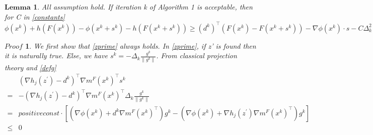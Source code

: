 \documentclass[10pt, oneside]{article}
\newtheorem{lem}[thm]{$\mathbf{Lemma}$}
\newtheorem*{Proof}{$Proof$}
\begin{document}
\begin{lem}
\label{acciterdecrease}
All assumption hold. If iteration k of Algorithm 1 is acceptable, then for C in \ref{constants}
\begin{equation}
\label{iterationdecrease}
\phi(x^k) +h(F(x^{k}))-\phi(x^k+s^k)-h(F(x^{k}+s^{k})) \geq\left(d^{k}\right)^{\top}\left(F(x^{k})-F(x^{k}+s^{k})\right)-\nabla\phi(x^k)\cdot s-C \Delta_{k}^{2}
\end{equation}
\end{lem}

\begin{Proof}
We first show that \ref{zprime} always holds. In \ref{zprime}, if z' is found then it is naturally true. Else, we have  $s^{k}=-\Delta_{k} \frac{g^{k}}{\left\|g^{k}\right\|}$. From classical projection theory and \ref{defg}
$$
\begin{aligned}
&\left(\nabla h_{j}\left(z^{\prime}\right)-d^{k}\right)^{\top} \nabla m^F(x^{k})^{\top} s^{k}\\
=&-\left(\nabla h_{j}\left(z^{\prime}\right)-d^{k}\right)^{\top} \nabla m^F(x^{k})^{\top} \Delta_{k} \frac{g^{k}}{\left\|g^{k}\right\|} \\
=&positiveconst\cdot\left[\left(\nabla\phi(x^k)+d^{k} \nabla m^F(x^{k})^{\top}\right) g^k-\left(\nabla\phi(x^k)+\nabla h_{j}\left(z^{\prime}\right) \nabla m^F(x^{k})^{\top}\right) g^k\right]\\
\leq&0
\end{aligned}
$$


\end{Proof}
\end{document}
